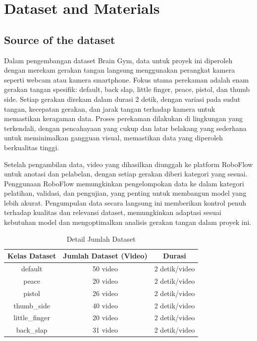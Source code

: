 \documentclass[12pt,a4paper]{article}
\begin{document}
\newpage

\section{Dataset and Materials}
\subsection{Source of the dataset}
Dalam pengembangan dataset Brain Gym, data untuk proyek ini diperoleh dengan merekam gerakan tangan langsung menggunakan perangkat kamera seperti webcam atau kamera smartphone. Fokus utama perekaman adalah enam gerakan tangan spesifik: default, back slap, little finger, peace, pistol, dan thumb side. Setiap gerakan direkam dalam durasi 2 detik, dengan variasi pada sudut tangan, kecepatan gerakan, dan jarak tangan terhadap kamera untuk memastikan keragaman data. Proses perekaman dilakukan di lingkungan yang terkendali, dengan pencahayaan yang cukup dan latar belakang yang sederhana untuk meminimalkan gangguan visual, memastikan data yang diperoleh berkualitas tinggi. 

Setelah pengambilan data, video yang dihasilkan diunggah ke platform RoboFlow untuk anotasi dan pelabelan, dengan setiap gerakan diberi kategori yang sesuai. Penggunaan RoboFlow memungkinkan pengelompokan data ke dalam kategori pelatihan, validasi, dan pengujian, yang penting untuk membangun model yang lebih akurat. Pengumpulan data secara langsung ini memberikan kontrol penuh terhadap kualitas dan relevansi dataset, memungkinkan adaptasi sesuai kebutuhan model dan mengoptimalkan analisis gerakan tangan dalam proyek ini.

\begin{table}[ht]
    \centering
    \begin{tabular}{|c|c|c|}
        \hline
        \textbf{Kelas Dataset} & \textbf{Jumlah Dataset (Video)} & \textbf{Durasi} \\ \hline
        default & 50 video & 2 detik/video \\ \hline
        peace & 20 video & 2 detik/video \\ \hline
        pistol & 26 video & 2 detik/video \\ \hline
        thumb\_side & 40 video & 2 detik/video \\ \hline
        little\_finger & 20 video & 2 detik/video \\ \hline
        back\_slap & 31 video & 2 detik/video \\ \hline
    \end{tabular}
    \caption{Detail Jumlah Dataset}
    \label{tab:dataset}
\end{table}
\end{document}

